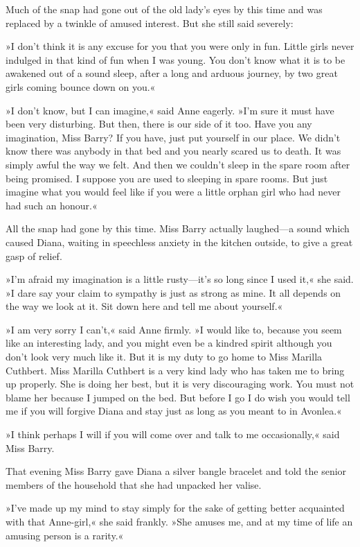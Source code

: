 Much of the snap had gone out of the old lady's eyes by this time and was replaced by a twinkle of amused interest. But she still said severely:

»I don't think it is any excuse for you that you were only in fun. Little girls never indulged in that kind of fun when I was young. You don't know what it is to be awakened out of a sound sleep, after a long and arduous journey, by two great girls coming bounce down on you.«

»I don't know, but I can imagine,« said Anne eagerly. »I'm sure it must have been very disturbing. But then, there is our side of it too. Have you any imagination, Miss Barry? If you have, just put yourself in our place. We didn't know there was anybody in that bed and you nearly scared us to death. It was simply awful the way we felt. And then we couldn't sleep in the spare room after being promised. I suppose you are used to sleeping in spare rooms. But just imagine what you would feel like if you were a little orphan girl who had never had such an honour.«

All the snap had gone by this time. Miss Barry actually laughed—a sound which caused Diana, waiting in speechless anxiety in the kitchen outside, to give a great gasp of relief.

»I'm afraid my imagination is a little rusty—it's so long since I used it,« she said. »I dare say your claim to sympathy is just as strong as mine. It all depends on the way we look at it. Sit down here and tell me about yourself.«

»I am very sorry I can't,« said Anne firmly. »I would like to, because you seem like an interesting lady, and you might even be a kindred spirit although you don't look very much like it. But it is my duty to go home to Miss Marilla Cuthbert. Miss Marilla Cuthbert is a very kind lady who has taken me to bring up properly. She is doing her best, but it is very discouraging work. You must not blame her because I jumped on the bed. But before I go I do wish you would tell me if you will forgive Diana and stay just as long as you meant to in Avonlea.«

»I think perhaps I will if you will come over and talk to me occasionally,« said Miss Barry.

That evening Miss Barry gave Diana a silver bangle bracelet and told the senior members of the household that she had unpacked her valise.

»I've made up my mind to stay simply for the sake of getting better acquainted with that Anne-girl,« she said frankly. »She amuses me, and at my time of life an amusing person is a rarity.«

